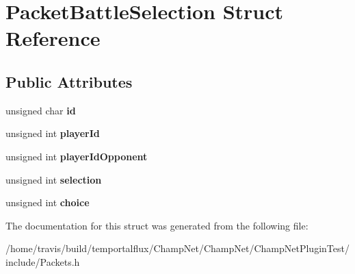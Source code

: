 \hypertarget{struct_packet_battle_selection}{\section{Packet\-Battle\-Selection Struct Reference}
\label{struct_packet_battle_selection}
}
\subsection*{Public Attributes}
\begin{DoxyCompactItemize}
\item 
\hypertarget{struct_packet_battle_selection_ad9d05ea40a225c467a8b88893f9936af}{unsigned char {\bfseries id}}\label{struct_packet_battle_selection_ad9d05ea40a225c467a8b88893f9936af}

\item 
\hypertarget{struct_packet_battle_selection_a767bb8ef07ff0e11ef9a248be56818e1}{unsigned int {\bfseries player\-Id}}\label{struct_packet_battle_selection_a767bb8ef07ff0e11ef9a248be56818e1}

\item 
\hypertarget{struct_packet_battle_selection_a7822f759fa2277fdae4d2e53850c4748}{unsigned int {\bfseries player\-Id\-Opponent}}\label{struct_packet_battle_selection_a7822f759fa2277fdae4d2e53850c4748}

\item 
\hypertarget{struct_packet_battle_selection_a39d44bbd7a4520259ef8d5133ccc5a83}{unsigned int {\bfseries selection}}\label{struct_packet_battle_selection_a39d44bbd7a4520259ef8d5133ccc5a83}

\item 
\hypertarget{struct_packet_battle_selection_ad8afea9993a2eb9a31e62d5d321ef80a}{unsigned int {\bfseries choice}}\label{struct_packet_battle_selection_ad8afea9993a2eb9a31e62d5d321ef80a}

\end{DoxyCompactItemize}


The documentation for this struct was generated from the following file\-:\begin{DoxyCompactItemize}
\item 
/home/travis/build/temportalflux/\-Champ\-Net/\-Champ\-Net/\-Champ\-Net\-Plugin\-Test/include/Packets.\-h\end{DoxyCompactItemize}
